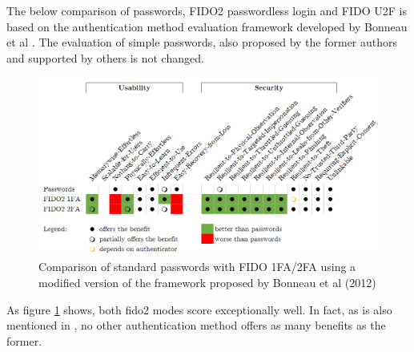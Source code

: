 The below comparison of passwords, FIDO2 passwordless login and FIDO U2F is based on the authentication method evaluation framework developed by Bonneau et al \cite{bonneau2012}. The evaluation of simple passwords, also proposed by the former authors and supported by others \cite{lyastani2020} is not changed.

\begin{figure}[ht]
    \centering
    \includegraphics[width=1.8\columnwidth]{Figures/bonneau_matrix.png}
    \caption[Comparison of Authentication Methods]{Comparison of standard passwords with FIDO 1FA/2FA using a modified version of the framework proposed by Bonneau et al (2012)}
    \label{fig:bonneau_matrix}
\end{figure}

\noindent As figure \ref{fig:bonneau_matrix} shows, both \ac{fido2} modes score exceptionally well. In fact, as is also mentioned in \cite{lyastani2020}, no other authentication method offers as many benefits as the former.